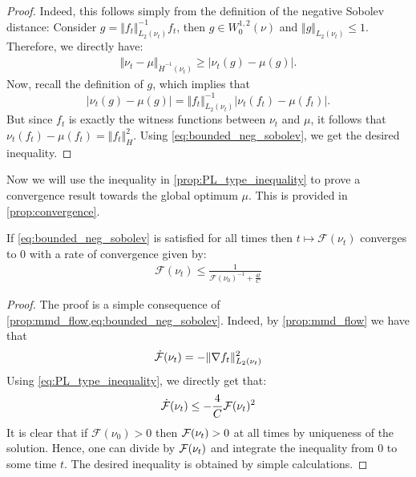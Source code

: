\begin{proof}
	Indeed, this follows simply from the definition of the negative Sobolev distance: Consider $g = \Vert f_t\Vert^{-1}_{L_2(\nu_t)} f_t$, then $g\in W_0^{1,2}(\nu)$  and $\Vert g \Vert_{L_2(\nu_t)}\leq 1$. Therefore, we directly have:
	\begin{align}
		\Vert \nu_t - \mu\Vert_{\dot{H}^{-1}(\nu_t)}\geq \vert \nu_t(g) - \mu(g)  \vert.
	\end{align}
Now, recall the definition of $g$, which implies that
\[
\vert \nu_t(g) - \mu(g)  \vert = \Vert f_t\Vert^{-1}_{L_2(\nu_t)} \vert \nu_t(f_t)-\mu(f_t)\vert.
\]
But since $f_t$  is exactly the witness functions between $\nu_t$ and $\mu$, it follows that $\nu_t(f_t)-\mu(f_t) = \Vert f_t\Vert^2_{H}$.
Using \cref{eq:bounded_neg_sobolev}, we get the desired inequality.
\end{proof}

Now we will use the inequality in \cref{prop:PL_type_inequality} to prove a convergence result towards the global optimum $\mu$. This is provided in \cref{prop:convergence}.
\begin{proposition}\label{prop:convergence}
	If \cref{eq:bounded_neg_sobolev} is satisfied for all times then $t\mapsto \mathcal{F}(\nu_t)$ converges to $0$ with a rate of convergence given by:
	\begin{align}
		\mathcal{F}(\nu_t)\leq \frac{1}{\mathcal{F}(\nu_0)^{-1} + \frac{4t}{C}}
	\end{align}
\end{proposition}
\begin{proof}
	The proof is a simple consequence of \cref{prop:mmd_flow,eq:bounded_neg_sobolev}. Indeed, by \cref{prop:mmd_flow} we have that 
	\begin{align}
		\dot{{{\mathcal F}}}(\nu_t) = - \Vert \nabla f_t \Vert^2_{L_2(\nu_t)} 	
	\end{align}
	Using \cref{eq:PL_type_inequality}, we directly get that:
	\begin{align}
		\dot{{{\mathcal F}}}(\nu_t) \leq  -\frac{4}{C}{{\mathcal F}}(\nu_t)^2
	\end{align}
It is clear that if $\mathcal{F}(\nu_0)>0$ then ${{\mathcal F}}(\nu_t)>0$ at all times by uniqueness of the solution. Hence, one can divide by ${{\mathcal F}}(\nu_t)$ and integrate the inequality from $0$ to some time $t$. The desired inequality is obtained by simple calculations.
\end{proof}

